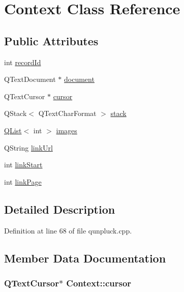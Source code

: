 \hypertarget{classContext}{\section{Context Class Reference}
\label{classContext}
}
\subsection*{Public Attributes}
\begin{DoxyCompactItemize}
\item 
int \hyperlink{classContext_a6e4cebbb704fa78d95c23d1fc86623c6}{record\+Id}
\item 
Q\+Text\+Document $\ast$ \hyperlink{classContext_a54035c81b3259aa6d9fb9d8385afc9d6}{document}
\item 
Q\+Text\+Cursor $\ast$ \hyperlink{classContext_ab83f5c15b8733c606bead2783ed8782d}{cursor}
\item 
Q\+Stack$<$ Q\+Text\+Char\+Format $>$ \hyperlink{classContext_a8ff44a70b52b8aefe89b4a4626b72fb3}{stack}
\item 
\hyperlink{classQList}{Q\+List}$<$ int $>$ \hyperlink{classContext_afe982728eb8a877661685cac947386ba}{images}
\item 
Q\+String \hyperlink{classContext_a8648a7eed8ea2b2a5b2e6b637b78f331}{link\+Url}
\item 
int \hyperlink{classContext_a7a0d307891ae75d44930ab89e43c3f38}{link\+Start}
\item 
int \hyperlink{classContext_ae18c8d60c78e06d96b0954bd72d35ef0}{link\+Page}
\end{DoxyCompactItemize}


\subsection{Detailed Description}


Definition at line 68 of file qunpluck.\+cpp.



\subsection{Member Data Documentation}
\hypertarget{classContext_ab83f5c15b8733c606bead2783ed8782d}{
\subsubsection[{cursor}]{\setlength{\rightskip}{0pt plus 5cm}Q\+Text\+Cursor$\ast$ Context\+::cursor}}\label{classContext_ab83f5c15b8733c606bead2783ed8782d}


